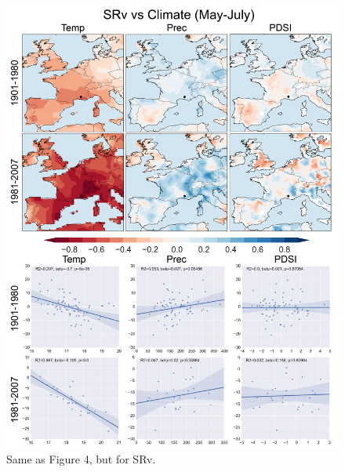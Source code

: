 \documentclass[12pt]{article}
\begin{document}
\begin{figure}
\center
\includegraphics[width=.9\columnwidth,scale=2]{SUPP_fig_10_SRv_MJJ_climate_onedeg_withtrend.png}
\caption{Same as Figure 4, but for SRv.}
\end{figure}
\end{document}
